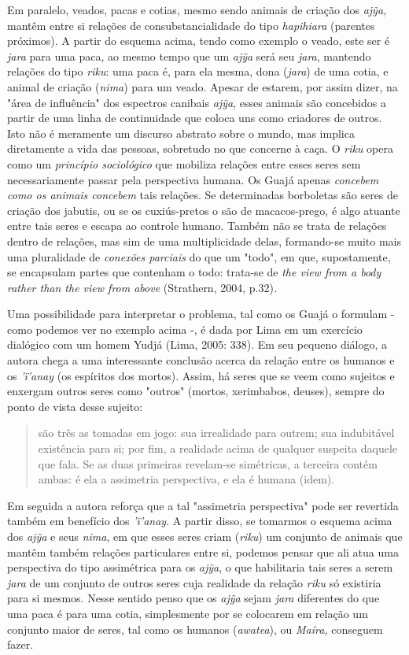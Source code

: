 Em paralelo, veados, pacas e cotias, mesmo sendo animais de criação dos
\emph{ajỹa,} mantêm entre si relações de consubstancialidade do tipo
\emph{hapihiara} (parentes próximos). A partir do esquema acima, tendo
como exemplo o veado, este ser é \emph{jara} para uma paca, ao mesmo
tempo que um \emph{ajỹa} será seu \emph{jara}, mantendo relações do tipo
\emph{riku}: uma paca é, para ela mesma, dona (\emph{jara}) de uma
cotia, e animal de criação (\emph{nima}) para um veado. Apesar de
estarem, por assim dizer, na "área de influência" dos espectros canibais
\emph{ajỹa}, esses animais são concebidos a partir de uma linha de
continuidade que coloca uns como criadores de outros. Isto não é
meramente um discurso abstrato sobre o mundo, mas implica diretamente a
vida das pessoas, sobretudo no que concerne à caça. O \emph{riku} opera
como um \emph{princípio sociológico} que mobiliza relações entre esses
seres sem necessariamente passar pela perspectiva humana. Os Guajá
apenas \emph{concebem} \emph{como os animais concebem} tais relações. Se
determinadas borboletas são seres de criação dos jabutis, ou se os
cuxiús-pretos o são de macacos-prego, é algo atuante entre tais seres e
escapa ao controle humano. Também não se trata de relações dentro de
relações, mas sim de uma multiplicidade delas, formando-se muito mais
uma pluralidade de \emph{conexões parciais} do que um "todo", em que,
supostamente, se encapsulam partes que contenham o todo: trata-se de
\emph{the view from a body rather than the view from above} (Strathern,
2004, p.32)\emph{.}

Uma possibilidade para interpretar o problema, tal como os Guajá o
formulam - como podemos ver no exemplo acima -, é dada por Lima em um
exercício dialógico com um homem Yudjá (Lima, 2005: 338). Em seu pequeno
diálogo, a autora chega a uma interessante conclusão acerca da relação
entre os humanos e os \emph{'ï'anay} (os espíritos dos mortos). Assim,
há seres que se veem como sujeitos e enxergam outros seres como "outros"
(mortos, xerimbabos, deuses), sempre do ponto de vista desse sujeito:

\begin{quote}
são três as tomadas em jogo: sua irrealidade para outrem; sua
indubitável existência para si; por fim, a realidade acima de qualquer
suspeita daquele que fala. Se as duas primeiras revelam-se simétricas, a
terceira contém ambas: é ela a assimetria perspectiva, e ela é humana
(idem).
\end{quote}

Em seguida a autora reforça que a tal "assimetria perspectiva" pode ser
revertida também em benefício dos \emph{'ï'anay}. A partir disso, se
tomarmos o esquema acima dos \emph{ajỹa} e seus \emph{nima}, em que
esses seres criam (\emph{riku}) um conjunto de animais que mantêm também
relações particulares entre si, podemos pensar que ali atua uma
perspectiva do tipo assimétrica para os \emph{ajỹa}, o que habilitaria
tais seres a serem \emph{jara} de um conjunto de outros seres cuja
realidade da relação \emph{riku} só existiria para si mesmos. Nesse
sentido penso que os \emph{ajỹa} sejam \emph{jara} diferentes do que uma
paca é para uma cotia, simplesmente por se colocarem em relação um
conjunto maior de seres, tal como os humanos (\emph{awatea}), ou
\emph{Maíra,} conseguem fazer.

